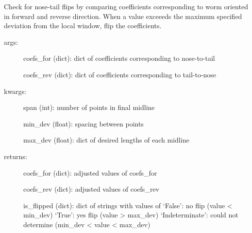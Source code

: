 \documentclass[letterpaper,10pt,openany,oneside]{sphinxmanual}
\begin{document}
\begin{fulllineitems}
\label{index:flipheadtail.checkflips}
Check for nose-tail flips by comparing coefficients corresponding to worm
oriented in forward and reverse direction. When a value exceeeds the 
maximum specified deviation from the local window, flip the coefficients.
\begin{description}
\item[{args:}] \leavevmode
coefs\_for (dict): dict of coefficients corresponding to nose-to-tail

coefs\_rev (dict): dict of coefficients corresponding to tail-to-nose

\item[{kwargs:}] \leavevmode
span (int): number of points in final midline

min\_dev (float): spacing between points

max\_dev (float): dict of desired lengths of each midline

\item[{returns:}] \leavevmode
coefs\_for (dict): adjusted values of coefs\_for

coefs\_rev (dict): adjusted values of coefs\_rev

is\_flipped (dict): dict of strings with values of 
`False': no flip (value \textless{} min\_dev) 
`True': yes flip (value \textgreater{} max\_dev) 
`Indeterminate': could not determine (min\_dev \textless{} value \textless{} max\_dev)

\end{description}

\end{fulllineitems}

\end{document}
